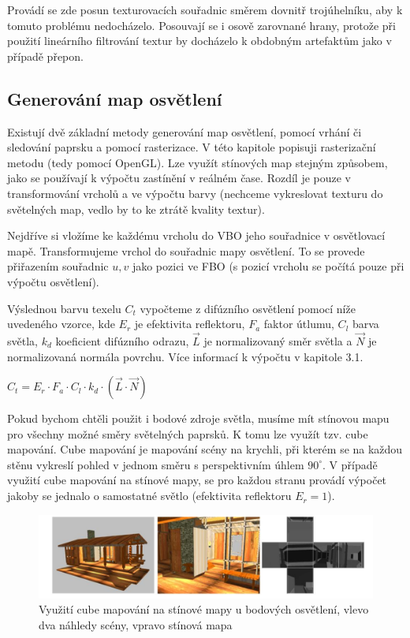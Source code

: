 \documentclass[11pt,twoside,a4paper]{book}
\begin{document}
Provádí se zde posun texturovacích souřadnic směrem dovnitř trojúhelníku, aby k tomuto problému nedocházelo. Posouvají se i osově zarovnané hrany, protože při použití lineárního filtrování textur by docházelo k obdobným artefaktům jako v případě přepon.

\subsection{Generování map osvětlení}
Existují dvě základní metody generování map osvětlení, pomocí vrhání či sledování paprsku a pomocí rasterizace. V této kapitole popisuji rasterizační metodu (tedy pomocí OpenGL). Lze využít stínových map stejným způsobem, jako se používají k výpočtu zastínění v reálném čase. Rozdíl je pouze v transformování vrcholů a ve výpočtu barvy (nechceme vykreslovat texturu do světelných map, vedlo by to ke ztrátě kvality textur).

Nejdříve si vložíme ke každému vrcholu do VBO jeho souřadnice v osvětlovací mapě. Transformujeme vrchol do souřadnic mapy osvětlení. To se provede přiřazením souřadnic $u, v$ jako pozici ve FBO (s pozicí vrcholu se počítá pouze při výpočtu osvětlení).

Výslednou barvu texelu $C_t$ vypočteme z difúzního osvětlení pomocí níže uvedeného vzorce, kde $E_r$ je efektivita reflektoru, $F_a$ faktor útlumu, $C_l$ barva světla, $k_d$ koeficient difúzního odrazu, $\vec{L}$ je normalizovaný směr světla a $\vec{N}$ je normalizovaná normála povrchu. Více informací k výpočtu v kapitole 3.1.
\begin{center}
$C_t = E_r \cdot F_a \cdot C_l \cdot k_d \cdot (\vec{L} \cdot \vec{N})$
\end{center}

Pokud bychom chtěli použit i bodové zdroje světla, musíme mít stínovou mapu pro všechny možné směry světelných paprsků. K tomu lze využít tzv. cube mapování. Cube mapování je mapování scény na krychli, při kterém se na každou stěnu vykreslí pohled v jednom směru s perspektivním úhlem $90^{\circ}$. V případě využití cube mapování na stínové mapy, se pro každou stranu provádí výpočet jakoby se jednalo o samostatné světlo (efektivita reflektoru $E_r = 1$).

\begin{center}
\begin{figure}[h]
\includegraphics[width=150mm]{figures/cubemap.png}
\caption{Využití cube mapování na stínové mapy u bodových osvětlení, vlevo dva náhledy scény, vpravo stínová mapa}
\end{figure}
\end{center}
\end{document}
